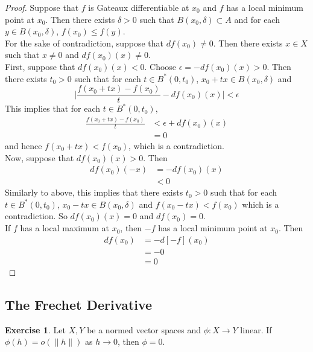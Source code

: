 \documentclass[12pt]{amsart}
\theoremstyle{definition}
\newtheorem{ex}[definition]{Exercise}
\newcommand{\del}{\delta}
\newcommand{\ep}{\epsilon}
\begin{document}
	\begin{proof}
	Suppose that $f$ is Gateaux differentiable at $x_0$ and $f$ has a local minimum point at $x_0$. Then there exists $\del >0 $ such that $B(x_0, \del) \subset A$ and for each $y \in B(x_0, \del)$, $f(x_0) \leq f(y)$. \\
	For the sake of contradiction, suppose that $df(x_0) \neq 0$. Then there exists $x \in X$ such that $x \neq 0$ and $df(x_0)(x) \neq 0$. \\
	First, suppose that $df(x_0)(x) < 0$. Choose $\ep = -df(x_0)(x) >0$. Then there exists $t_0 >0$ such that for each $t \in B^*(0, t_0)$, $x_0 + tx \in B(x_0, \del)$ and $$\bigg | \frac{f(x_0 + tx) - f(x_0)}{t} - df(x_0)(x) \bigg | < \ep$$ 
	This implies that for each $t \in B^*(0, t_0)$,
	\begin{align*}
	\frac{f(x_0 + tx) - f(x_0)}{t}  
	&< \ep + df(x_0)(x) \\
	&= 0
	\end{align*} 
	and hence $f(x_0 + tx) < f(x_0)$, which is a contradiction. \\
	Now, suppose that $df(x_0)(x) > 0$. Then 
	\begin{align*}
	df(x_0)(-x) 
	&= -df(x_0)(x) \\
	& < 0
	\end{align*}
	Similarly to above, this implies that there exists $t_0 >0$ such that for each $t \in B^*(0, t_0)$, $x_0 - tx \in B(x_0, \del)$ and $f(x_0 - tx) < f(x_0)$ which is a contradiction. So $df(x_0)(x) = 0$ and $df(x_0) = 0$. \\
	If $f$ has a local maximum at $x_0$, then $-f$ has a local minimum point at $x_0$. Then 
	\begin{align*}
	df(x_0)
	&= -d[-f](x_0) \\
	&= -0 \\
	&= 0
\end{align*}	 
	\end{proof}
	
	
	
	
	
	
	
	
	
	
	
	
	
	
	
	
	\newpage
	\subsection{The Frechet Derivative}
	
	\begin{ex}
	Let $X,Y$ be a normed vector spaces and $\phi: X \rightarrow Y$ linear. If $\phi(h) = o(\|h\|)$ as $h \rightarrow 0$, then $\phi = 0$. 
	\end{ex}
	
\end{document}
